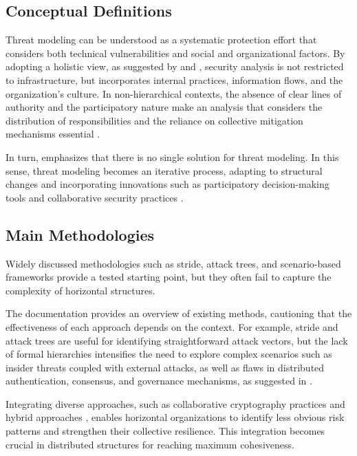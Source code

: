 \subsection{Conceptual Definitions}
\label{subsec:conceptual_definitions}

Threat modeling can be understood as a systematic protection effort that
considers both technical vulnerabilities and social and organizational factors.
By adopting a holistic view, as suggested by
\cite{ThreatModelingAsABasisForSecurityRequirements} and
\cite{AdvancedThreatModeling}, security analysis is not restricted to
infrastructure, but incorporates internal practices, information flows, and the
organization's culture. In non-hierarchical contexts, the absence of clear lines
of authority and the participatory nature make an analysis that considers the
distribution of responsibilities and the reliance on collective mitigation
mechanisms essential \cite{Colbac}.

In turn, \cite{DemystifyingTheThreatModelingProcess} emphasizes that there is no
single solution for threat modeling. In this sense, threat modeling becomes an
iterative process, adapting to structural changes and incorporating innovations
such as participatory decision-making tools and collaborative security practices
\cite{ParticipatoryThreatModelling}.

\subsection{Main Methodologies}
\label{subsec:main_methodologies}

Widely discussed methodologies such as \gls{stride}, attack trees, and
scenario-based frameworks \cite{EvaluationofCompetingThreatModeling} provide a
tested starting point, but they often fail to capture the complexity of
horizontal structures.

The documentation \cite{ThreatModelingASummaryOfAvailableMethods} provides an
overview of existing methods, cautioning that the effectiveness of each approach
depends on the context. For example, \gls{stride} and attack trees are useful
for identifying straightforward attack vectors, but the lack of formal
hierarchies intensifies the need to explore complex scenarios such as insider
threats coupled with external attacks, as well as flaws in distributed
authentication, consensus, and governance mechanisms, as suggested in
\cite{Colbac, AttackTrees, STRIDEthreatmodelingforcyberphysical}.

Integrating diverse approaches, such as collaborative cryptography practices
\cite{AbcCrypto} and hybrid approaches \cite{CoReTM}, enables horizontal
organizations to identify less obvious risk patterns and strengthen their
collective resilience. This integration becomes crucial in distributed
structures for reaching maximum cohesiveness.

